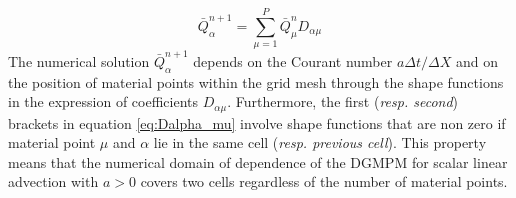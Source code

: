 \begin{equation}
\bar{Q}^{n+1}_\alpha = \sum_{\mu=1}^P \bar{Q}^n_{\mu} D_{\alpha\mu} \label{eq:scheme_Dpi}
\end{equation}
The numerical solution $\bar{Q}^{n+1}_\alpha$ depends on the Courant number $a\Delta t / \Delta X$ and on the position of material points within the grid mesh through the shape functions in the expression of coefficients $D_{\alpha\mu}$. Furthermore, the first (\textit{resp. second}) brackets in equation \eqref{eq:Dalpha_mu} involve shape functions that are non zero if material point $\mu$ and $\alpha$ lie in the same cell (\textit{resp. previous cell}). This property means that the numerical domain of dependence of the DGMPM for scalar linear advection with $a>0$ covers two cells regardless of the number of material points.


